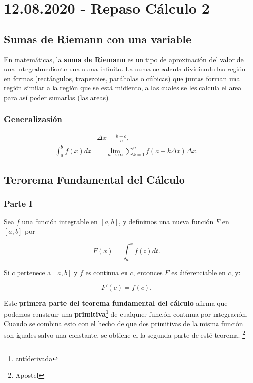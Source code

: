 \documentclass[a4paper]{book}
\begin{document}
\section{12.08.2020 - Repaso Cálculo 2}
\label{sec:repaso_calculo_2}

\subsection{Sumas de Riemann con una variable}
\label{ssec:sumas_de_riemann_con_una_variable}

En matemáticas, la \textbf{suma de Riemann} es un tipo de aproxinación del
valor de una integralmediante una suma infinita. La suma se calcula dividiendo
las región en formas (rectángulos, trapezoies, parábolas o cúbicas) que juntas
forman una región similar a la región que se está midiento, a las cuales se les
calcula el area para así poder sumarlas (las areas).

\subsubsection{Generalizasión}

\begin{align*}
    &\Delta x= \frac{b-a}{n},\\
    \int_{a}^{b}f\left(x\right)dx &= \lim_{n \to \infty}\sum_{k=1}^{n} f\left( a+k\Delta x\right)\Delta x
.\end{align*}


\subsection{Terorema Fundamental del Cálculo}
\label{ssec:terorema_fundamental_del_calculo}

\subsubsection{Parte I}

Sea \(f\) una función integrable en \(\left[a,b\right]\), y definimos una nueva
función \(F\) en \(\left[a,b\right]\) por:

\[
    F\left(x\right) = \int_{a}^{x} f\left(t\right) dt
.\]

Si \(c \text{ pertenece a }\left[a,b\right] \) y  \(f\) es continua en \(c\), entonces \(F\) es diferenciable en \(c\), y:

\[
F'\left(c\right)=f\left(c\right)
.\]

Este \textbf{primera parte del teorema fundamental del cálculo} afirma que
podemos construir una \textbf{primitiva}\footnote{antíderivada} de cualquier
función continua por integración. Cuando se combina esto con el hecho de que
dos primitivas de la misma función son iguales salvo una constante, se obtiene
el la segunda parte de esté teorema. \footnote{Apostol}
\end{document}
